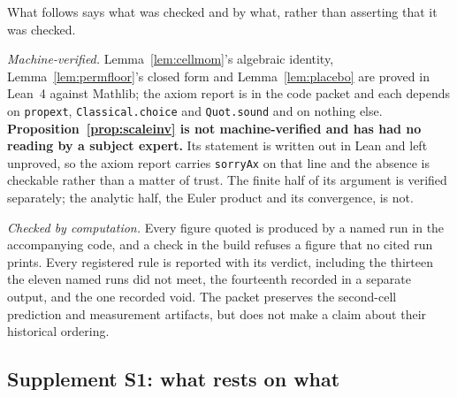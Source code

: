 \documentclass[11pt,a4paper]{article}
\theoremstyle{plain}
\theoremstyle{definition}
\theoremstyle{remark}
\begin{document}
What follows says what was checked and by what, rather than asserting
that it was checked.

\emph{Machine-verified.} Lemma~\ref{lem:cellmom}'s algebraic identity,
Lemma~\ref{lem:permfloor}'s closed form and Lemma~\ref{lem:placebo}
are proved in Lean~4 against Mathlib; the axiom report is in the code
packet and each depends on \texttt{propext}, \texttt{Classical.choice}
and \texttt{Quot.sound} and on nothing else. \textbf{Proposition~\ref{prop:scaleinv}
is not machine-verified and has had no reading by a subject expert.}
Its statement is written out in Lean and left unproved, so the axiom
report carries \texttt{sorryAx} on that line and the absence is
checkable rather than a matter of trust. The finite half of its
argument is verified separately; the analytic half, the Euler product
and its convergence, is not.

\emph{Checked by computation.} Every figure quoted is produced by a
named run in the accompanying code, and a check in the build refuses a
figure that no cited run prints. Every registered rule is reported with
its verdict, including the thirteen the eleven named runs did not meet, the
fourteenth recorded in a separate output, and the one recorded void. The packet preserves the second-cell prediction and
measurement artifacts, but does not make a claim about their historical
ordering.

\subsection*{Supplement S1: what rests on what}
\end{document}
